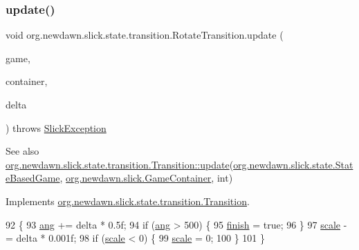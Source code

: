 \subsubsection{\texorpdfstring{update()}{update()}}
{\footnotesize\ttfamily void org.\+newdawn.\+slick.\+state.\+transition.\+Rotate\+Transition.\+update (\begin{DoxyParamCaption}\item[{\mbox{\hyperlink{classorg_1_1newdawn_1_1slick_1_1state_1_1_state_based_game}{State\+Based\+Game}}}]{game,  }\item[{\mbox{\hyperlink{classorg_1_1newdawn_1_1slick_1_1_game_container}{Game\+Container}}}]{container,  }\item[{int}]{delta }\end{DoxyParamCaption}) throws \mbox{\hyperlink{classorg_1_1newdawn_1_1slick_1_1_slick_exception}{Slick\+Exception}}\hspace{0.3cm}{\ttfamily [inline]}}

\begin{DoxySeeAlso}{See also}
\mbox{\hyperlink{interfaceorg_1_1newdawn_1_1slick_1_1state_1_1transition_1_1_transition_a9be3072f6e2423e3d0a451a419d1d518}{org.\+newdawn.\+slick.\+state.\+transition.\+Transition\+::update}}(\mbox{\hyperlink{classorg_1_1newdawn_1_1slick_1_1state_1_1_state_based_game}{org.\+newdawn.\+slick.\+state.\+State\+Based\+Game}}, \mbox{\hyperlink{classorg_1_1newdawn_1_1slick_1_1_game_container}{org.\+newdawn.\+slick.\+Game\+Container}}, int) 
\end{DoxySeeAlso}


Implements \mbox{\hyperlink{interfaceorg_1_1newdawn_1_1slick_1_1state_1_1transition_1_1_transition_a9be3072f6e2423e3d0a451a419d1d518}{org.\+newdawn.\+slick.\+state.\+transition.\+Transition}}.


\begin{DoxyCode}
92                                   \{
93         \mbox{\hyperlink{classorg_1_1newdawn_1_1slick_1_1state_1_1transition_1_1_rotate_transition_aea66eb59377c5e7f66b7a91642c06130}{ang}} += delta * 0.5f;
94         \textcolor{keywordflow}{if} (\mbox{\hyperlink{classorg_1_1newdawn_1_1slick_1_1state_1_1transition_1_1_rotate_transition_aea66eb59377c5e7f66b7a91642c06130}{ang}} > 500) \{
95             \mbox{\hyperlink{classorg_1_1newdawn_1_1slick_1_1state_1_1transition_1_1_rotate_transition_ab25369d5c3cf43e51ac230f817b7557d}{finish}} = \textcolor{keyword}{true};
96         \}
97         \mbox{\hyperlink{classorg_1_1newdawn_1_1slick_1_1state_1_1transition_1_1_rotate_transition_aa8eff3f2cd4d25051e010b2c95fa8ef1}{scale}} -= delta * 0.001f;
98         \textcolor{keywordflow}{if} (\mbox{\hyperlink{classorg_1_1newdawn_1_1slick_1_1state_1_1transition_1_1_rotate_transition_aa8eff3f2cd4d25051e010b2c95fa8ef1}{scale}} < 0) \{
99             \mbox{\hyperlink{classorg_1_1newdawn_1_1slick_1_1state_1_1transition_1_1_rotate_transition_aa8eff3f2cd4d25051e010b2c95fa8ef1}{scale}} = 0;
100         \}
101     \}
\end{DoxyCode}


